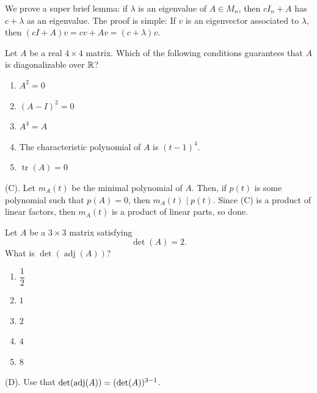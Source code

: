 \begin{remark}
We prove a super brief lemma: if $\lambda$ is an eigenvalue of $A \in M_n$, then $cI_n + A$
has $c + \lambda$ as an eigenvalue. The proof is simple: If $v$ is an eigenvector associated to 
$\lambda$, then $(cI + A)v = cv + Av = (c + \lambda)v$.
\end{remark}

\begin{exercise}
Let $A$ be a real $4\times4$ matrix. Which of the following conditions guarantees 
that $A$ is diagonalizable over $\mathbb{R}$?
\begin{enumerate}[label=(\Alph*)]
    \item $A^2=0$
    \item $(A-I)^2=0$
    \item $A^3=A$
    \item The characteristic polynomial of $A$
          is $(t-1)^4$.
    \item $\operatorname{tr}(A)=0$
\end{enumerate}
\end{exercise}
\begin{solution}
(C). Let $m_A(t)$ be the minimal polynomial of $A$. Then, if $p(t)$ is some polynomial 
such that $p(A) = 0$, then $m_A(t) \mid p(t)$. Since (C) is a product of linear factors, 
then $m_A(t)$ is a product of linear parts, so done.
\end{solution}

\begin{exercise}
Let $A$ be a $3\times3$ matrix satisfying
\[
\det(A)=2.
\]
What is $\det(\operatorname{adj}(A))$?
\begin{enumerate}[label=(\Alph*)]
    \item $\dfrac12$
    \item $1$
    \item $2$
    \item $4$
    \item $8$
\end{enumerate}
\end{exercise}
\begin{solution}
(D). Use that $\det(\operatorname{adj}(A)) = (\det(A))^{3 - 1}$.
\end{solution}

